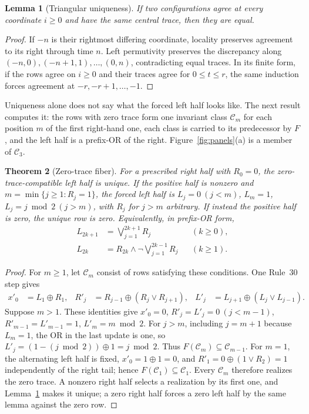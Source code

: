 \documentclass[11pt]{article}
\newtheorem{theorem}{Theorem}[section]
\newtheorem{lemma}[theorem]{Lemma}
\theoremstyle{definition}
\begin{document}
\begin{lemma}[Triangular uniqueness]\label{lem:unique}
If two configurations agree at every coordinate $i\ge0$ and have the same
central trace, then they are equal.
\end{lemma}
\begin{proof}
If $-n$ is their rightmost differing coordinate, locality preserves agreement
to its right through time $n$. Left permutivity preserves the discrepancy
along $(-n,0),(-n+1,1),\dots,(0,n)$, contradicting equal traces. In its finite
form, if the rows agree on $i\ge0$ and their traces agree for $0\le t\le r$,
the same induction forces agreement at $-r,-r+1,\dots,-1$.
\end{proof}

Uniqueness alone does not say what the forced left half looks like. The next
result computes it: the rows with zero trace form one invariant class
$\mathcal C_m$ for each position $m$ of the first right-hand one, each class is
carried to its predecessor by $F$, and the left half is a prefix-OR of the
right. Figure~\ref{fig:panels}(a) is a member of $\mathcal C_3$.

\begin{theorem}[Zero-trace fiber]\label{thm:fiber}
For a prescribed right half with $R_0=0$, the zero-trace-compatible left half is
unique. If the positive half is nonzero and $m=\min\{j\ge1:R_j=1\}$, the forced
left half is $L_j=0\ (j<m)$, $L_m=1$, $L_j=j\bmod2\ (j>m)$, with $R_j$ for
$j>m$ arbitrary. If instead the positive half is zero, the unique row is zero.
Equivalently, in prefix-OR form,
\begin{align}
 L_{2k+1}&=\bigvee_{j=1}^{2k+1}R_j &&(k\ge0),\\[-2pt]
 L_{2k}&=R_{2k}\land\neg\!\bigvee_{j=1}^{2k-1}R_j &&(k\ge1).
\end{align}
\end{theorem}
\begin{proof}
For $m\ge1$, let $\mathcal C_m$ consist of rows satisfying these conditions.
One Rule~30 step gives
\begin{equation}\label{eq:updates}
\begin{aligned}
 x'_0&=L_1\oplus R_1, &
 R'_j&=R_{j-1}\oplus(R_j\lor R_{j+1}), &
 L'_j&=L_{j+1}\oplus(L_j\lor L_{j-1}).
\end{aligned}
\end{equation}
Suppose $m>1$. These identities give $x'_0=0$, $R'_j=L'_j=0\ (j<m-1)$,
$R'_{m-1}=L'_{m-1}=1$, $L'_m=m\bmod2$. For $j>m$, including $j=m+1$ because
$L_m=1$, the OR in the last update is one, so $L'_j=(1-(j\bmod2))\oplus1=j\bmod2$.
Thus $F(\mathcal C_m)\subseteq\mathcal C_{m-1}$. For $m=1$, the alternating left
half is fixed, $x'_0=1\oplus1=0$, and $R'_1=0\oplus(1\lor R_2)=1$ independently
of the right tail; hence $F(\mathcal C_1)\subseteq\mathcal C_1$. Every
$\mathcal C_m$ therefore realizes the zero trace. A nonzero right half selects a
realization by its first one, and Lemma~\ref{lem:unique} makes it unique; a
zero right half forces a zero left half by the same lemma against the zero row.
\end{proof}
\end{document}
